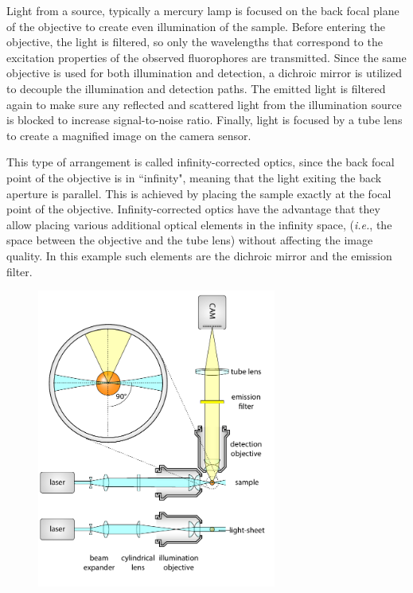     Light from a source, typically a mercury lamp is focused on the back focal plane of the objective to create even illumination of the sample. Before entering the objective, the light is filtered, so only the wavelengths that correspond to the excitation properties of the observed fluorophores are transmitted. Since the same objective is used for both illumination and detection, a dichroic mirror is utilized to decouple the illumination and detection paths. The emitted light is filtered again to make sure any reflected and scattered light from the illumination source is blocked to increase signal-to-noise ratio.
    Finally, light is focused by a tube lens to create a magnified image on the camera sensor.
    
    This type of arrangement is called infinity-corrected optics, since the back focal point of the objective is in ``infinity", meaning that the light exiting the back aperture is parallel. This is achieved by placing the sample exactly at the focal point of the objective. Infinity-corrected optics have the advantage that they allow placing various additional optical elements in the infinity space, (\textit{i.e.}, the space between the objective and the tube lens) without affecting the image quality. In this example such elements are the dichroic mirror and the emission filter. 

    \begin{figure}[tb]
      \centering
      \includegraphics[page=4,width=0.7\textwidth]{spim_cyl}
      \label{fig:wide-field}
    \end{figure}


